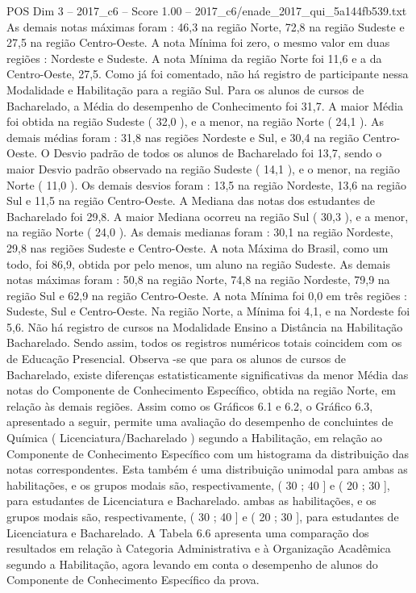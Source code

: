 \begin{textsample}{POS Dim 3 – 2017\_c6 – Score 1.00 – 2017\_c6/enade\_2017\_qui\_5a144fb539.txt}
As demais notas máximas foram : 46,3 na região Norte, 72,8 na região Sudeste e 27,5 na região Centro-Oeste.
A nota Mínima foi zero, o mesmo valor em duas regiões : Nordeste e Sudeste.
A nota Mínima da região Norte foi 11,6 e a da Centro-Oeste, 27,5.
Como já foi comentado, não há registro de participante nessa Modalidade e Habilitação para a região Sul.
Para os alunos de cursos de Bacharelado, a Média do desempenho de Conhecimento foi 31,7.
A maior Média foi obtida na região Sudeste ( 32,0 ), e a menor, na região Norte ( 24,1 ).
As demais médias foram : 31,8 nas regiões Nordeste e Sul, e 30,4 na região Centro-Oeste.
O Desvio padrão de todos os alunos de Bacharelado foi 13,7, sendo o maior Desvio padrão observado na região Sudeste ( 14,1 ), e o menor, na região Norte ( 11,0 ).
Os demais desvios foram : 13,5 na região Nordeste, 13,6 na região Sul e 11,5 na região Centro-Oeste.
A Mediana das notas dos estudantes de Bacharelado foi 29,8.
A maior Mediana ocorreu na região Sul ( 30,3 ), e a menor, na região Norte ( 24,0 ).
As demais medianas foram : 30,1 na região Nordeste, 29,8 nas regiões Sudeste e Centro-Oeste.
A nota Máxima do Brasil, como um todo, foi 86,9, obtida por pelo menos, um aluno na região Sudeste.
As demais notas máximas foram : 50,8 na região Norte, 74,8 na região Nordeste, 79,9 na região Sul e 62,9 na região Centro-Oeste.
A nota Mínima foi 0,0 em três regiões : Sudeste, Sul e Centro-Oeste.
Na região Norte, a Mínima foi 4,1, e na Nordeste foi 5,6.
Não há registro de cursos na Modalidade Ensino a Distância na Habilitação Bacharelado.
Sendo assim, todos os registros numéricos totais coincidem com os de Educação Presencial.
Observa -se que para os alunos de cursos de Bacharelado, existe diferenças estatisticamente significativas da menor Média das notas do Componente de Conhecimento Específico, obtida na região Norte, em relação às demais regiões.
Assim como os Gráficos 6.1 e 6.2, o Gráfico 6.3, apresentado a seguir, permite uma avaliação do desempenho de concluintes de Química ( Licenciatura/Bacharelado ) segundo a Habilitação, em relação ao Componente de Conhecimento Específico com um histograma da distribuição das notas correspondentes.
Esta também é uma distribuição unimodal para ambas as habilitações, e os grupos modais são, respectivamente, ( 30 ; 40 ] e ( 20 ; 30 ], para estudantes de Licenciatura e Bacharelado. ambas as habilitações, e os grupos modais são, respectivamente, ( 30 ; 40 ] e ( 20 ; 30 ], para estudantes de Licenciatura e Bacharelado.
A Tabela 6.6 apresenta uma comparação dos resultados em relação à Categoria Administrativa e à Organização Acadêmica segundo a Habilitação, agora levando em conta o desempenho de alunos do Componente de Conhecimento Específico da prova.

\end{textsample}
